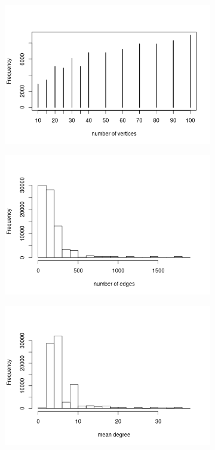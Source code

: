 \documentclass{l4proj}
\theoremstyle{definition}
\theoremstyle{remark}
\begin{document}
\begin{figure}
  \centering
  \begin{subfigure}[t]{0.49\textwidth}
    \centering
    \includegraphics[width=\textwidth]{images/mcs_vertices.png}
  \end{subfigure}
  \begin{subfigure}[t]{0.49\textwidth}
    \centering
    \includegraphics[width=\textwidth]{images/mcs_edges.png}
  \end{subfigure}
  \begin{subfigure}[t]{0.49\textwidth}
    \centering
    \includegraphics[width=\textwidth]{images/mcs_meandeg.png}

\end{subfigure}
\end{figure}
\end{document}
